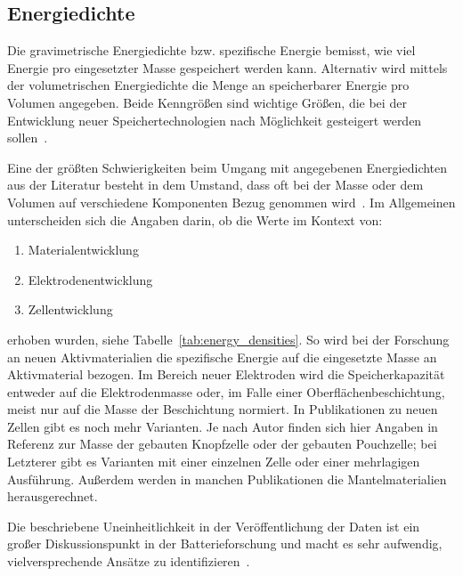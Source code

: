 \subsection{Energiedichte}
Die gravimetrische Energiedichte bzw. spezifische Energie bemisst, wie viel Energie pro eingesetzter Masse gespeichert werden kann. Alternativ wird mittels der volumetrischen Energiedichte die Menge an speicherbarer Energie pro Volumen angegeben. Beide Kenngrößen sind wichtige Größen, die bei der Entwicklung neuer Speichertechnologien nach Möglichkeit gesteigert werden sollen~\cite{Plett2015}.

Eine der größten Schwierigkeiten beim Umgang mit angegebenen Energiedichten aus der Literatur besteht in dem Umstand, dass oft bei der Masse oder dem Volumen auf verschiedene Komponenten Bezug genommen wird~\cite{Son2021}. Im Allgemeinen unterscheiden sich die Angaben darin, ob die Werte im Kontext von:
\begin{enumerate}
	\item Materialentwicklung
	\item Elektrodenentwicklung
	\item Zellentwicklung
\end{enumerate}
erhoben wurden, siehe Tabelle~\ref{tab:energy_densities}.
So wird bei der Forschung an neuen Aktivmaterialien die spezifische Energie auf die eingesetzte Masse an Aktivmaterial bezogen. Im Bereich neuer Elektroden wird die Speicherkapazität entweder auf die Elektrodenmasse oder, im Falle einer Oberflächenbeschichtung, meist nur auf die Masse der Beschichtung normiert. In Publikationen zu neuen Zellen gibt es noch mehr Varianten. Je nach Autor finden sich hier Angaben in Referenz zur Masse der gebauten Knopfzelle oder der gebauten Pouchzelle; bei Letzterer gibt es Varianten mit einer einzelnen Zelle oder einer mehrlagigen Ausführung. Außerdem werden in manchen Publikationen die Mantelmaterialien herausgerechnet.

Die beschriebene Uneinheitlichkeit in der Veröffentlichung der Daten ist ein großer Diskussionspunkt in der Batterieforschung und macht es sehr aufwendig, vielversprechende Ansätze zu identifizieren~\cite{Greenhalgh2023, Zschiebsch2024}.

